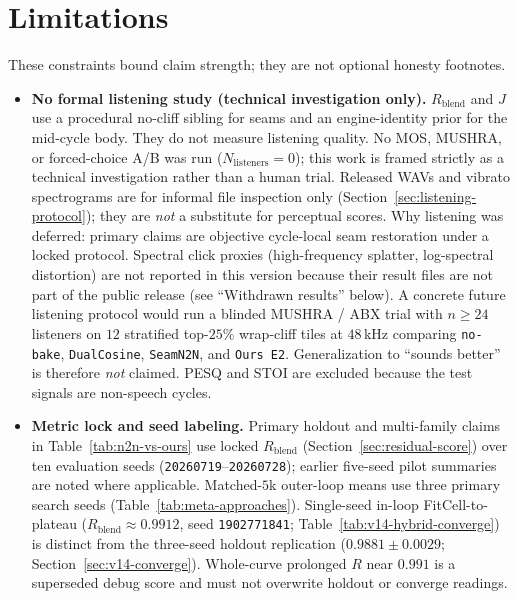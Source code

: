 \section{Limitations}
\label{sec:limitations}

These constraints bound claim strength; they are not optional honesty footnotes.

\begin{itemize}
  \item \textbf{No formal listening study (technical investigation only).}
    $R_{\mathrm{blend}}$ and $J$ use a procedural no-cliff sibling for seams and an engine-identity prior for the mid-cycle body.
    They do not measure listening quality.
    No MOS, MUSHRA, or forced-choice A/B was run ($N_{\mathrm{listeners}}{=}0$); this work is framed strictly as a technical investigation rather than a human trial.
    Released WAVs and vibrato spectrograms are for informal file inspection only
    (Section~\ref{sec:listening-protocol}); they are \emph{not} a substitute for perceptual scores.
    Why listening was deferred: primary claims are objective cycle-local seam restoration under a locked protocol. Spectral click proxies (high-frequency splatter, log-spectral distortion) are not reported in this version because their result files are not part of the public release (see ``Withdrawn results'' below). A concrete future listening protocol would run a blinded MUSHRA / ABX trial with $n{\ge}24$ listeners on $12$ stratified top-$25\%$ wrap-cliff tiles at $48$\,kHz comparing \texttt{no-bake}, \texttt{DualCosine}, \texttt{SeamN2N}, and \texttt{Ours E2}.
    Generalization to ``sounds better'' is therefore \emph{not} claimed.
    PESQ and STOI are excluded because the test signals are non-speech cycles.
  \item \textbf{Metric lock and seed labeling.}
    Primary holdout and multi-family claims in Table~\ref{tab:n2n-vs-ours} use locked $R_{\mathrm{blend}}$ (Section~\ref{sec:residual-score}) over ten evaluation seeds (\texttt{20260719}--\texttt{20260728}); earlier five-seed pilot summaries are noted where applicable.
    Matched-$5$k outer-loop means use three primary search seeds (Table~\ref{tab:meta-approaches}).
    Single-seed in-loop FitCell-to-plateau ($R_{\mathrm{blend}}{\approx}0.9912$, seed \texttt{1902771841}; Table~\ref{tab:v14-hybrid-converge}) is distinct from the three-seed holdout replication ($0.9881{\pm}0.0029$; Section~\ref{sec:v14-converge}).
    Whole-curve prolonged $R$ near $0.991$ is a superseded debug score and must not overwrite holdout or converge readings.

\end{itemize}
